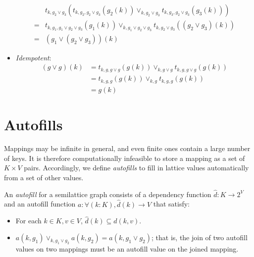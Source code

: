 \documentclass{article}
\begin{document}
\begin{itemize}
\begin{align*}
               & t_{k, g_2 \vee g_3}(t_{k, g_2, g_2 \vee g_3}(g_2(k)) \vee_{k, g_2 \vee g_3} t_{k, g_3, g_2 \vee g_3}(g_3(k))) \\
              =& t_{k, g_1, g_1 \vee g_2 \vee g_3}(g_1(k)) \vee_{k, g_1 \vee g_2 \vee g_3} t_{k, g_2 \vee g_3}((g_2 \vee g_3)(k)) \\
              =& (g_1 \vee (g_2 \vee g_3))(k)
            \end{align*}
          \item \emph{Idempotent}:
            \begin{align*}
              (g \vee g)(k) &= t_{k, g, g \vee g}(g(k)) \vee_{k, g \vee g} t_{k, g, g \vee g}(g(k)) \\
              &= t_{k, g, g}(g(k)) \vee_{k, g} t_{k, g, g}(g(k)) \\
              &= g(k)
            \end{align*}
        \end{itemize}

    \section{Autofills}

        Mappings may be infinite in general, and even finite ones contain a large number of keys. It is therefore computationally infeasible to store a mapping as a set of $K \times V$ pairs. Accordingly, we define \emph{autofills} to fill in lattice values automatically from a set of other values.




        An \emph{autofill} for a semilattice graph consists of a dependency function $\hat{d}: K \rightarrow 2^V$ and an autofill function $a : \forall (k:K), \hat{d}(k) \rightarrow V$ that satisfy:

        \begin{itemize}
          \item
            For each $k \in K, v \in V$, $\hat{d}(k) \subseteq d(k, v)$.
          \item
            $a(k, g_1) \vee_{k, g_1 \vee g_2} a(k, g_2) = a(k, g_1 \vee g_2)$; that is, the join of two autofill values on two mappings must be an autofill value on the joined mapping.
        \end{itemize}
\end{document}
